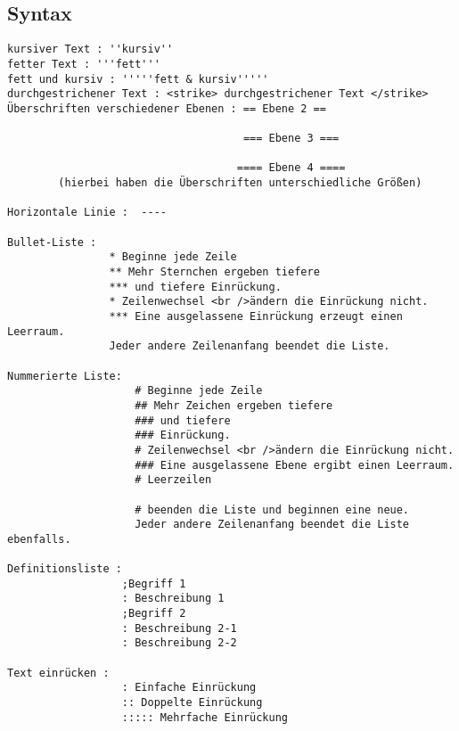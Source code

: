 \subsection{Syntax}
 \begin{verbatim}
kursiver Text : ''kursiv''
fetter Text : '''fett'''
fett und kursiv : '''''fett & kursiv'''''
durchgestrichener Text : <strike> durchgestrichener Text </strike>
Überschriften verschiedener Ebenen : == Ebene 2 ==

                                     === Ebene 3 ===

                                    ==== Ebene 4 ====  
		(hierbei haben die Überschriften unterschiedliche Größen)

Horizontale Linie :  ----

Bullet-Liste : 
                * Beginne jede Zeile
                ** Mehr Sternchen ergeben tiefere
                *** und tiefere Einrückung.
                * Zeilenwechsel <br />ändern die Einrückung nicht.
                *** Eine ausgelassene Einrückung erzeugt einen Leerraum.
                Jeder andere Zeilenanfang beendet die Liste.

Nummerierte Liste: 
                    # Beginne jede Zeile
                    ## Mehr Zeichen ergeben tiefere
                    ### und tiefere
                    ### Einrückung.
                    # Zeilenwechsel <br />ändern die Einrückung nicht.
                    ### Eine ausgelassene Ebene ergibt einen Leerraum.
                    # Leerzeilen

                    # beenden die Liste und beginnen eine neue.
                    Jeder andere Zeilenanfang beendet die Liste ebenfalls.

Definitionsliste : 
                  ;Begriff 1
                  : Beschreibung 1
                  ;Begriff 2
                  : Beschreibung 2-1
                  : Beschreibung 2-2
                  
Text einrücken : 
                  : Einfache Einrückung
                  :: Doppelte Einrückung
                  ::::: Mehrfache Einrückung
 \end{verbatim}
